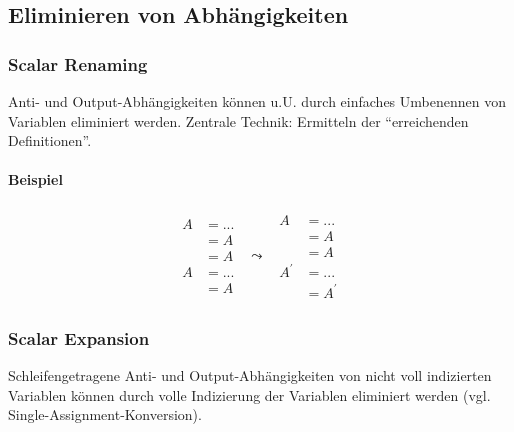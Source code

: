  
\def\ins{\hspace{.5cm}}

\subsection{Eliminieren von Abhängigkeiten}

\subsubsection{Scalar Renaming}

Anti- und Output-Abhängigkeiten können u.U. durch einfaches Umbenennen
von Variablen eliminiert werden. Zentrale Technik: Ermitteln der
``erreichenden Definitionen''.

\paragraph{Beispiel}



\[
\begin{array}{ccc}
\begin{aligned}
A &= ... \\
   &= A \\
   &= A \\
A &= ... \\
   &= A
\end{aligned}
&
\leadsto
&
\begin{aligned}
A &= ... \\
   &= A \\
   &= A \\
A^\prime &= ... \\
   &= A^\prime
\end{aligned}
\end{array}
\]



\subsubsection{Scalar Expansion}

Schleifengetragene Anti- und Output-Abhängigkeiten von nicht voll
indizierten Variablen können durch volle Indizierung der Variablen
eliminiert werden (vgl. Single-Assignment-Konversion).


